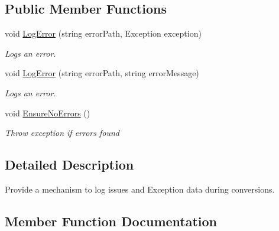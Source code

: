 \subsection*{Public Member Functions}
\begin{DoxyCompactItemize}
\item 
void \hyperlink{interfaceCqrs_1_1WebApi_1_1Formatters_1_1FormMultipart_1_1Infrastructure_1_1Logger_1_1IFormDataConverterLogger_a7da0b7749a50f6fed2cb5ab0d8efef2a_a7da0b7749a50f6fed2cb5ab0d8efef2a}{Log\+Error} (string error\+Path, Exception exception)
\begin{DoxyCompactList}\small\item\em Logs an error. \end{DoxyCompactList}\item 
void \hyperlink{interfaceCqrs_1_1WebApi_1_1Formatters_1_1FormMultipart_1_1Infrastructure_1_1Logger_1_1IFormDataConverterLogger_a0067054a5f882d2687e8fd9f9ae38e9b_a0067054a5f882d2687e8fd9f9ae38e9b}{Log\+Error} (string error\+Path, string error\+Message)
\begin{DoxyCompactList}\small\item\em Logs an error. \end{DoxyCompactList}\item 
void \hyperlink{interfaceCqrs_1_1WebApi_1_1Formatters_1_1FormMultipart_1_1Infrastructure_1_1Logger_1_1IFormDataConverterLogger_a53cf31f01e5ceb5efcc8ed3d874c319a_a53cf31f01e5ceb5efcc8ed3d874c319a}{Ensure\+No\+Errors} ()
\begin{DoxyCompactList}\small\item\em Throw exception if errors found \end{DoxyCompactList}\end{DoxyCompactItemize}


\subsection{Detailed Description}
Provide a mechanism to log issues and Exception data during conversions. 



\subsection{Member Function Documentation}
\mbox{\label{interfaceCqrs_1_1WebApi_1_1Formatters_1_1FormMultipart_1_1Infrastructure_1_1Logger_1_1IFormDataConverterLogger_a53cf31f01e5ceb5efcc8ed3d874c319a_a53cf31f01e5ceb5efcc8ed3d874c319a}} 
